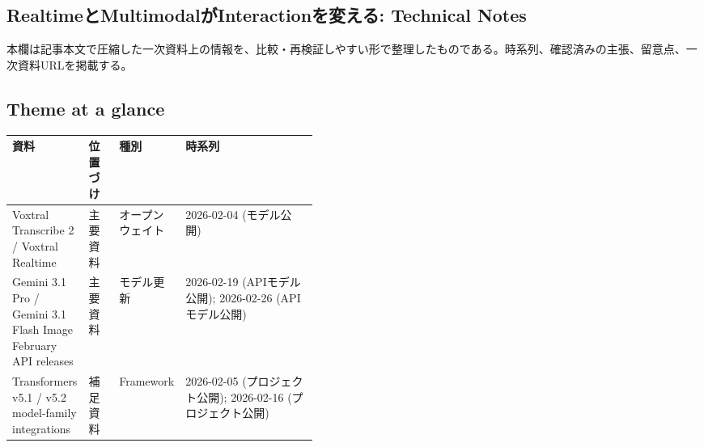 \subsection*{RealtimeとMultimodalがInteractionを変える: Technical Notes}
本欄は記事本文で圧縮した一次資料上の情報を、比較・再検証しやすい形で整理したものである。時系列、確認済みの主張、留意点、一次資料URLを掲載する。
\medskip
\subsection*{Theme at a glance}
\begin{center}
\footnotesize
\begin{tabularx}{\linewidth}{@{}p{0.20\linewidth}p{0.10\linewidth}p{0.14\linewidth}X@{}}
\toprule
資料 & 位置づけ & 種別 & 時系列 \\
\midrule
Voxtral Transcribe 2 / Voxtral Realtime & 主要資料 & オープンウェイト & 2026-02-04 (モデル公開) \\
Gemini 3.1 Pro / Gemini 3.1 Flash Image February API releases & 主要資料 & モデル更新 & 2026-02-19 (APIモデル公開); 2026-02-26 (APIモデル公開) \\
Transformers v5.1 / v5.2 model-family integrations & 補足資料 & Framework & 2026-02-05 (プロジェクト公開); 2026-02-16 (プロジェクト公開) \\
\bottomrule
\end{tabularx}
\end{center}
\normalsize

